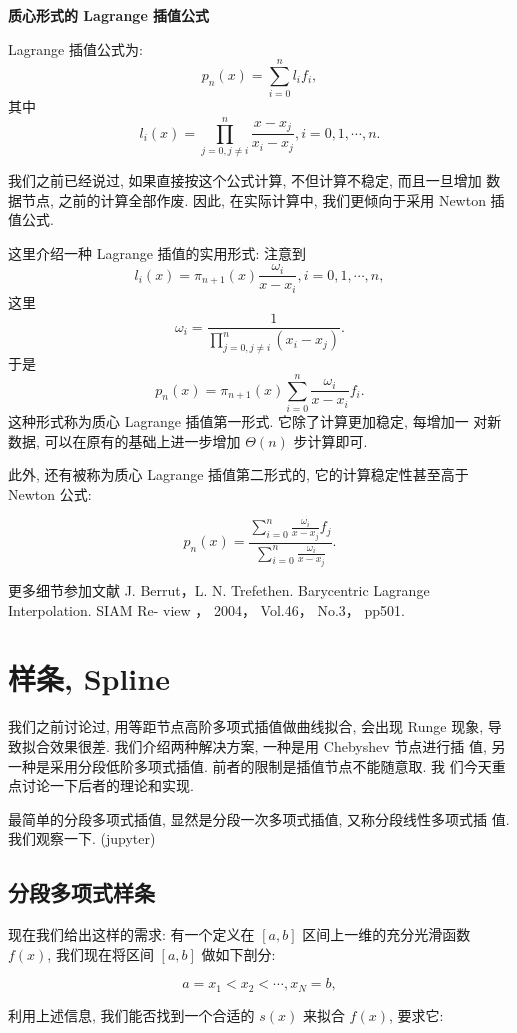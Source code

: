 \documentclass[a4paper]{ctexart}
\begin{document}
{\bf 质心形式的 Lagrange 插值公式}

Lagrange 插值公式为:
$$
p_n(x) = \sum_{i = 0}^n l_i f_i,
$$
其中
$$
l_i(x) = \prod_{j = 0, j \neq i}^n \frac{x - x_j}{x_i - x_j}, i = 0, 1, \cdots, n.
$$

我们之前已经说过, 如果直接按这个公式计算, 不但计算不稳定, 而且一旦增加
数据节点, 之前的计算全部作废. 因此, 在实际计算中, 我们更倾向于采用
Newton 插值公式.

这里介绍一种 Lagrange 插值的实用形式: 注意到
$$
l_i(x) = \pi_{n + 1}(x) \frac{\omega_i}{x - x_i}, i = 0, 1, \cdots, n,
$$
这里
$$
\omega_i = \frac{1}{\displaystyle \prod_{j = 0, j \neq i}^n (x_i - x_j)}.
$$
于是
$$
p_n(x) = \pi_{n + 1}(x)\sum_{i = 0}^n \frac{\omega_i}{x - x_i} f_i.
$$
这种形式称为质心 Lagrange 插值第一形式. 它除了计算更加稳定, 每增加一
对新数据, 可以在原有的基础上进一步增加 $\Theta(n)$ 步计算即可.

此外, 还有被称为质心 Lagrange 插值第二形式的, 它的计算稳定性甚至高于
Newton 公式:

$$
p_n(x) = \frac{\displaystyle\sum_{i = 0}^n\frac{\omega_i}{x - x_j} f_j}
  {\displaystyle\sum_{i = 0}^n\frac{\omega_i}{x - x_j}}.
$$

更多细节参加文献 J. Berrut，L. N. Trefethen. Barycentric Lagrange Interpolation. SIAM Re-
view ， 2004， Vol.46， No.3， pp501.

\section{样条, Spline}

我们之前讨论过, 用等距节点高阶多项式插值做曲线拟合, 会出现 Runge 现象,
导致拟合效果很差. 我们介绍两种解决方案, 一种是用 Chebyshev 节点进行插
值, 另一种是采用分段低阶多项式插值. 前者的限制是插值节点不能随意取. 我
们今天重点讨论一下后者的理论和实现.

最简单的分段多项式插值, 显然是分段一次多项式插值, 又称分段线性多项式插
值. 我们观察一下. (jupyter)

\subsection{分段多项式样条}

现在我们给出这样的需求: 有一个定义在 $[a, b]$ 区间上一维的充分光滑函数
$f(x)$, 我们现在将区间 $[a, b]$ 做如下剖分:

$$
a = x_1 < x_2 < \cdots, x_N = b, 
$$

利用上述信息, 我们能否找到一个合适的 $s(x)$ 来拟合 $f(x)$, 要求它:
\end{document}
